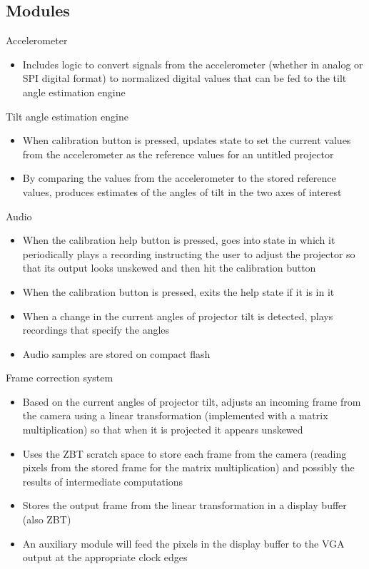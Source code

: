 \documentclass{article}
\begin{document}
\subsection{Modules}
\begin{description}
	\item{Accelerometer}
	\begin{itemize}
		\item Includes logic to convert signals from the accelerometer (whether in analog or SPI digital format) to normalized digital values that can be fed to the tilt angle estimation engine
	\end{itemize}
	\item{Tilt angle estimation engine}
	\begin{itemize}
		\item When calibration button is pressed, updates state to set the current values from the accelerometer as the reference values for an untitled projector
		\item By comparing the values from the accelerometer to the stored reference values, produces estimates of the angles of tilt in the two axes of interest
	\end{itemize}
	\item{Audio}
	\begin{itemize}
		\item When the calibration help button is pressed, goes into state in which it periodically plays a recording instructing the user to adjust the projector so that its output looks unskewed and then hit the calibration button
		\item When the calibration button is pressed, exits the help state if it is in it
    \item When a change in the current angles of projector tilt is detected, plays recordings that specify the angles
		\item Audio samples are stored on compact flash
	\end{itemize}
  \item{Frame correction system}
	\begin{itemize}
		\item Based on the current angles of projector tilt, adjusts an incoming frame from the camera using a linear transformation (implemented with a matrix multiplication) so that when it is projected it appears unskewed
		\item Uses the ZBT scratch space to store each frame from the camera (reading pixels from the stored frame for the matrix multiplication) and possibly the results of intermediate computations
    \item Stores the output frame from the linear transformation in a display buffer (also ZBT)
    \item An auxiliary module will feed the pixels in the display buffer to the VGA output at the appropriate clock edges
	\end{itemize}
\end{description}
\end{document}

